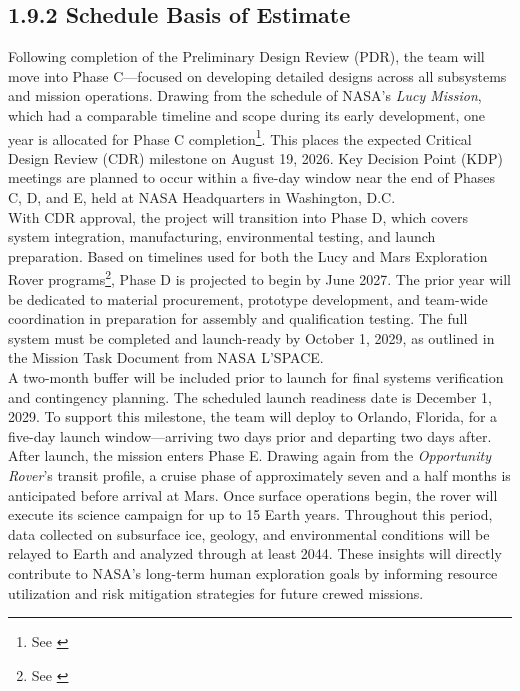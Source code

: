 \subsection*{1.9.2 Schedule Basis of Estimate}

Following completion of the Preliminary Design Review (PDR), the team will move into Phase C—focused on developing detailed designs across all subsystems and mission operations. Drawing from the schedule of NASA’s \textit{Lucy Mission}, which had a comparable timeline and scope during its early development, one year is allocated for Phase C completion\footnote{See \cite{lucy_timeline}}. This places the expected Critical Design Review (CDR) milestone on August 19, 2026. Key Decision Point (KDP) meetings are planned to occur within a five-day window near the end of Phases C, D, and E, held at NASA Headquarters in Washington, D.C.\\

With CDR approval, the project will transition into Phase D, which covers system integration, manufacturing, environmental testing, and launch preparation. Based on timelines used for both the Lucy and Mars Exploration Rover programs\footnote{See \cite{lucy_cost, mer_cost}}, Phase D is projected to begin by June 2027. The prior year will be dedicated to material procurement, prototype development, and team-wide coordination in preparation for assembly and qualification testing. The full system must be completed and launch-ready by October 1, 2029, as outlined in the Mission Task Document from NASA L'SPACE.\\

A two-month buffer will be included prior to launch for final systems verification and contingency planning. The scheduled launch readiness date is December 1, 2029. To support this milestone, the team will deploy to Orlando, Florida, for a five-day launch window—arriving two days prior and departing two days after.\\

After launch, the mission enters Phase E. Drawing again from the \textit{Opportunity Rover}'s transit profile, a cruise phase of approximately seven and a half months is anticipated before arrival at Mars. Once surface operations begin, the rover will execute its science campaign for up to 15 Earth years. Throughout this period, data collected on subsurface ice, geology, and environmental conditions will be relayed to Earth and analyzed through at least 2044. These insights will directly contribute to NASA’s long-term human exploration goals by informing resource utilization and risk mitigation strategies for future crewed missions.